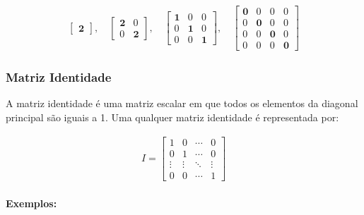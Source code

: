\[
    \begin{matrix}
        \begin{bmatrix}
            \mathbf{2}
        \end{bmatrix},
        \quad
        \begin{bmatrix}
            \mathbf{2} & 0          \\
            0          & \mathbf{2}
        \end{bmatrix},
        \quad
        \begin{bmatrix}
            \mathbf{1} & 0          & 0          \\
            0          & \mathbf{1} & 0          \\
            0          & 0          & \mathbf{1}
        \end{bmatrix},
        \quad
        \begin{bmatrix}
            \mathbf{0} & 0          & 0          & 0          \\
            0          & \mathbf{0} & 0          & 0          \\
            0          & 0          & \mathbf{0} & 0          \\
            0          & 0          & 0          & \mathbf{0}
        \end{bmatrix}
    \end{matrix}
\]

\subsubsection{Matriz Identidade}
\indent

A matriz identidade é uma matriz escalar em que todos os elementos da diagonal principal são iguais a 1. Uma qualquer matriz identidade é representada por:

\[
    \begin{matrix}
        I = \begin{bmatrix}
                1      & 0      & \cdots & 0      \\
                0      & 1      & \cdots & 0      \\
                \vdots & \vdots & \ddots & \vdots \\
                0      & 0      & \cdots & 1
            \end{bmatrix}
    \end{matrix}
\]

\paragraph{Exemplos:}

